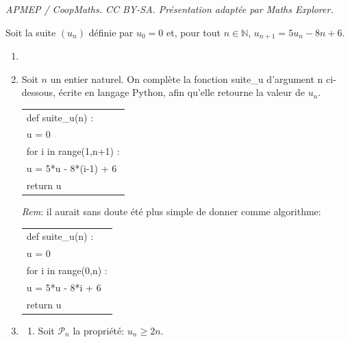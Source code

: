 \documentclass[10pt]{article}
\providecommand{\red}{\color{red}}
\providecommand{\blue}{\color{blue}}
\providecommand{\N}{\mathbb{N}}
\providecommand{\blue}{\color{blue}}
\providecommand{\red}{\color{red}}
\begin{document}
\noindent\textit{APMEP / CoopMaths. CC BY-SA. Présentation adaptée par Maths Explorer.}\par\medskip
\medskip

Soit la suite $\left(u_n\right)$ définie par $u_0 = 0$ et, pour tout $n \in \N$, 
$u_{n+1} = 5u_n - 8n + 6$.



\begin{enumerate}
\item
{}

\item Soit $n$ un entier naturel.
On complète la fonction {\ttfamily suite\_u} d'argument {\ttfamily n}  ci-dessous, écrite en langage Python, afin qu'elle retourne la valeur de $u_n$.

\begin{center}
\begin{tabular}{>{\ttfamily}l}
def suite\_u(n) : \\
\qquad u = \blue 0\\
\qquad for i in range(1,n+1) :\\
\qquad \vline \qquad u = \blue 5*u - 8*(i-1) + 6\\
\qquad return u
\end{tabular}
\end{center}

\emph{Rem}: il aurait sans doute été plus simple de donner comme algorithme:

\begin{center}
\begin{tabular}{>{\ttfamily}l}
def suite\_u(n) : \\
\qquad u = \blue 0\\
\qquad for i in \red range(0,n) :\\
\qquad \vline \qquad u = \blue 5*u - 8*i + 6\\
\qquad return u
\end{tabular}
\end{center}

\item
	\begin{enumerate}
		\item Soit $\mathcal{P}_n$ la propriété:  $u_n \geqslant 2n$.


\end{enumerate}
\end{enumerate}
\end{document}
